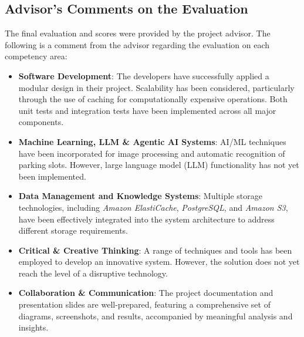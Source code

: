 \subsection{Advisor's Comments on the Evaluation}
\label{advisor-comments-evaluation}
The final evaluation and scores were provided by the project advisor. The following is a comment from the advisor regarding the evaluation on each competency area:
\begin{itemize}[itemsep=0.2em, topsep=0.2em, parsep=0pt, partopsep=0pt]
    \item \textbf{Software Development}: The developers have successfully applied a modular design in their project. Scalability has been considered, particularly through the use of caching for computationally expensive operations. Both unit tests and integration tests have been implemented across all major components.
    \item \textbf{Machine Learning, LLM \& Agentic AI Systems}: AI/ML techniques have been incorporated for image processing and automatic recognition of parking slots. However, large language model (LLM) functionality has not yet been implemented.
    \item \textbf{Data Management and Knowledge Systems}: Multiple storage technologies, including \textit{Amazon ElastiCache}, \textit{PostgreSQL}, and \textit{Amazon S3}, have been effectively integrated into the system architecture to address different storage requirements.
    \item \textbf{Critical \& Creative Thinking}: A range of techniques and tools has been employed to develop an innovative system. However, the solution does not yet reach the level of a disruptive technology.
    \item \textbf{Collaboration \& Communication}: The project documentation and presentation slides are well-prepared, featuring a comprehensive set of diagrams, screenshots, and results, accompanied by meaningful analysis and insights.
\end{itemize}

